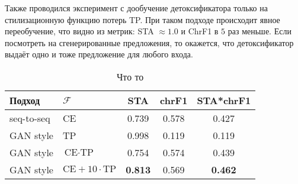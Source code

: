 Также проводился эксперимент с дообучение детоксификатора только на стилизационную функцию потерь TP. 
При таком подходе происходит явное переобучение, что видно из метрик: STA $\approx 1.0$ и ChrF1 в $5$ раз меньше. 
Если посмотреть на сгенерированные предложения, то окажется, что детоксификатор выдаёт одно и тоже предложение для любого входа.

\begin{table}[ht]
\centering
 \begin{tabular}{|l l|c c c|} 
 \hline
 Подход & $\mathcal{F} $ & STA & chrF1 & STA*chrF1 \\ [0.5ex] 
 \hline
 seq-to-seq & CE & 0.739 & 0.578 & 0.427 \\ 
 GAN style & TP & 0.998 & 0.119 & 0.119 \\ 
 GAN style & $\text{CE} \cdot \text{TP}$  & 0.754 & 0.574 & 0.439 \\
 GAN style & $\text{CE} + 10 \cdot \text{TP}$ & \textbf{0.813} & 0.569 & \textbf{0.462} \\
 \hline
 \end{tabular}
\caption{Что то}
\label{table:final_exp}
\end{table}
